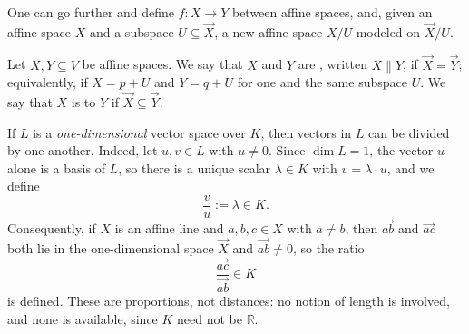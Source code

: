 \begin{remark}
One can go further and define  $f \colon X \to Y$ between affine spaces, and, given an affine space $X$ and a subspace $U \subseteq \vec{X}$, a new affine space $X/U$ modeled on $\vec{X}/U$.
\end{remark}

\begin{definition}
\label{def:affine_parallel}
Let $X, Y \subseteq V$ be affine spaces. We say that $X$ and $Y$ are , written $X \parallel Y$, if $\vec{X} = \vec{Y}$; equivalently, if $X = p + U$ and $Y = q + U$ for one and the same subspace $U$. We say that $X$ is  to $Y$ if $\vec{X} \subseteq \vec{Y}$.
\end{definition}

\begin{importantremark}
\label{rem:ratio_of_vectors}
If $L$ is a \emph{one-dimensional} vector space over $K$, then vectors in $L$ can be divided by one another. Indeed, let $u, v \in L$ with $u \neq 0$. Since $\dim L = 1$, the vector $u$ alone is a basis of $L$, so there is a unique scalar $\lambda \in K$ with $v = \lambda \cdot u$, and we define
\[
\frac{v}{u} := \lambda \in K.
\]
Consequently, if $X$ is an affine line and $a, b, c \in X$ with $a \neq b$, then $\vec{ab}$ and $\vec{ac}$ both lie in the one-dimensional space $\vec{X}$ and $\vec{ab} \neq 0$, so the ratio
\[
\frac{\vec{ac}}{\vec{ab}} \in K
\]
is defined. These are proportions, not distances: no notion of length is involved, and none is available, since $K$ need not be $\mathbb{R}$.
\end{importantremark}


\begin{center}
\end{center}

